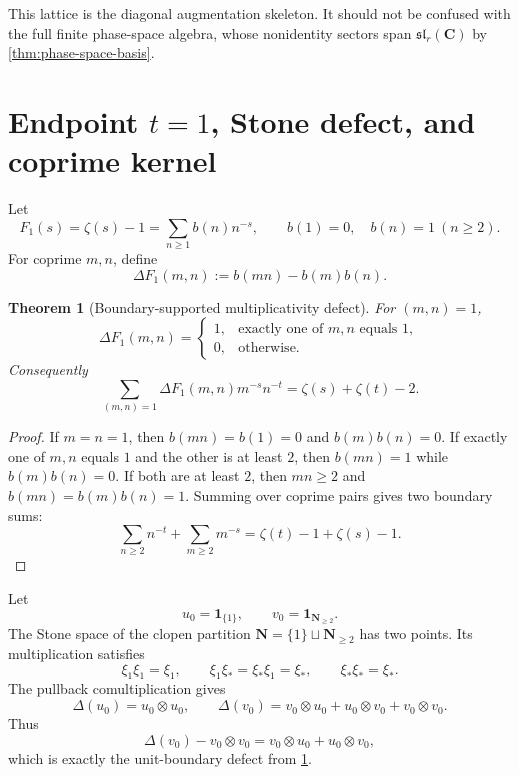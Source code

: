 \documentclass[11pt]{article}
\newcommand{\C}{\mathbf C}
\newcommand{\N}{\mathbf N}
\newcommand{\1}{\mathbf 1}
\newtheorem{theorem}{Theorem}[section]
\numberwithin{equation}{section}
\begin{document}
This lattice is the diagonal augmentation skeleton.  It should not be confused with the full finite phase-space algebra, whose nonidentity sectors span $\mathfrak{sl}_r(\C)$ by \cref{thm:phase-space-basis}.

\section{Endpoint $t=1$, Stone defect, and coprime kernel}\label{sec:stone}

Let
\begin{equation}
  F_1(s)=\zeta(s)-1=\sum_{n\ge1}b(n)n^{-s},
  \qquad
  b(1)=0,
  \quad
  b(n)=1\ (n\ge2).
\end{equation}
For coprime $m,n$, define
\begin{equation}
  \Delta F_1(m,n):=b(mn)-b(m)b(n).
\end{equation}

\begin{theorem}[Boundary-supported multiplicativity defect]\label{thm:stone-boundary}
For $(m,n)=1$,
\begin{equation}
  \Delta F_1(m,n)=
  \begin{cases}
    1,&\text{exactly one of }m,n\text{ equals }1,\\
    0,&\text{otherwise}.
  \end{cases}
\end{equation}
Consequently
\begin{equation}
  \sum_{(m,n)=1}\Delta F_1(m,n)m^{-s}n^{-t}=\zeta(s)+\zeta(t)-2.
\end{equation}
\end{theorem}

\begin{proof}
If $m=n=1$, then $b(mn)=b(1)=0$ and $b(m)b(n)=0$.  If exactly one of $m,n$ equals $1$ and the other is at least $2$, then $b(mn)=1$ while $b(m)b(n)=0$.  If both are at least $2$, then $mn\ge2$ and $b(mn)=b(m)b(n)=1$.  Summing over coprime pairs gives two boundary sums:
\begin{equation}
  \sum_{n\ge2}n^{-t}+\sum_{m\ge2}m^{-s}=\zeta(t)-1+\zeta(s)-1.
\end{equation}
\end{proof}

Let
\begin{equation}
  u_0=\mathbf 1_{\{1\}},
  \qquad
  v_0=\mathbf 1_{\N_{\ge2}}.
\end{equation}
The Stone space of the clopen partition $\N=\{1\}\sqcup\N_{\ge2}$ has two points.  Its multiplication satisfies
\begin{equation}
  \xi_1\xi_1=\xi_1,
  \qquad
  \xi_1\xi_*=\xi_*\xi_1=\xi_*,
  \qquad
  \xi_*\xi_*=\xi_*.
\end{equation}
The pullback comultiplication gives
\begin{equation}
  \Delta(u_0)=u_0\otimes u_0,
  \qquad
  \Delta(v_0)=v_0\otimes u_0+u_0\otimes v_0+v_0\otimes v_0.
\end{equation}
Thus
\begin{equation}
  \Delta(v_0)-v_0\otimes v_0=v_0\otimes u_0+u_0\otimes v_0,
\end{equation}
which is exactly the unit-boundary defect from \cref{thm:stone-boundary}.
\end{document}
